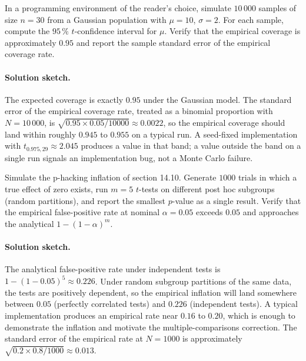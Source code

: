 \begin{exercise}
In a programming environment of the reader's choice, simulate
$10\,000$ samples of size $n = 30$ from a Gaussian population with
$\mu = 10$, $\sigma = 2$. For each sample, compute the $95\,\%$
$t$-confidence interval for $\mu$. Verify that the empirical
coverage is approximately $0.95$ and report the sample standard
error of the empirical coverage rate.

\paragraph{Solution sketch.} The expected coverage is exactly
$0.95$ under the Gaussian model. The standard error of the
empirical coverage rate, treated as a binomial proportion with
$N = 10\,000$, is $\sqrt{0.95 \times 0.05 / 10000} \approx
0.0022$, so the empirical coverage should land within roughly
$0.945$ to $0.955$ on a typical run. A seed-fixed implementation
with $t_{0.975, 29} \approx 2.045$ produces a value in that band;
a value outside the band on a single run signals an
implementation bug, not a Monte Carlo failure.
\end{exercise}

\begin{exercise}
Simulate the p-hacking inflation of section 14.10. Generate $1000$
trials in which a true effect of zero exists, run $m = 5$
$t$-tests on different post hoc subgroups (random partitions),
and report the smallest $p$-value as a single result. Verify that
the empirical false-positive rate at nominal $\alpha = 0.05$
exceeds $0.05$ and approaches the analytical $1 - (1-\alpha)^{m}$.

\paragraph{Solution sketch.} The analytical false-positive rate
under independent tests is $1 - (1 - 0.05)^{5} \approx 0.226$.
Under random subgroup partitions of the same data, the tests are
positively dependent, so the empirical inflation will land
somewhere between $0.05$ (perfectly correlated tests) and $0.226$
(independent tests). A typical implementation produces an
empirical rate near $0.16$ to $0.20$, which is enough to
demonstrate the inflation and motivate the multiple-comparisons
correction. The standard error of the empirical rate at
$N = 1000$ is approximately $\sqrt{0.2 \times 0.8 / 1000}
\approx 0.013$.
\end{exercise}

